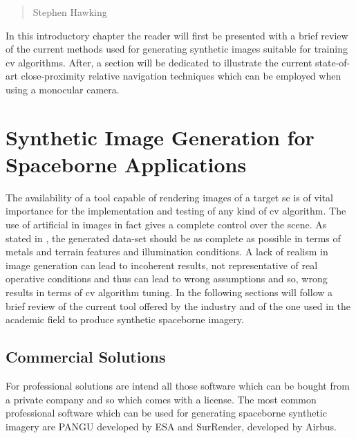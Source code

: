 \begin{quotation}
  {\footnotesize
    \begin{flushright}
      Stephen Hawking
    \end{flushright}
  }
\end{quotation}
\vspace{0.5cm}

In this introductory chapter the reader will first be presented with a brief review of the current methods used for generating synthetic images suitable for training \acrshort{cv} algorithms. After, a section will be dedicated to illustrate the current state-of-art close-proximity relative navigation techniques which can be employed when using a monocular camera.

\section{Synthetic Image Generation for Spaceborne Applications}
The availability of a tool capable of rendering images of a target \acrshort{sc} is of vital importance for the implementation and testing of any kind of \acrshort{cv} algorithm. The use of artificial in images in fact gives a complete control over the scene. As stated in \cite{paolocorti}, the generated data-set should be as complete as possible in terms of metals and terrain features and illumination conditions. A lack of realism in image generation can lead to incoherent results, not representative of real operative conditions and thus can lead to wrong assumptions and so, wrong results in terms of \acrshort{cv} algorithm tuning. In the following sections will follow a brief review of the current tool offered by the industry and of the one used in the academic field to produce synthetic spaceborne imagery.

\subsection{Commercial Solutions}
For professional solutions are intend all those software which can be bought from a private company and so which comes with a license. The most common professional software which can be used for generating spaceborne synthetic imagery are PANGU developed by ESA and SurRender, developed by Airbus.

